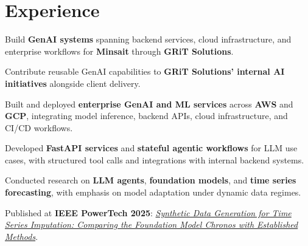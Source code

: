 \documentclass{seb-cv}
\begin{document}
\begin{minipage}[t]{0.64\textwidth}

\section{Experience}

\begin{tightemize}
  \item Build \textbf{GenAI systems} spanning backend services, cloud infrastructure, and enterprise workflows for \textbf{Minsait} through \textbf{GRiT Solutions}.
  \item Contribute reusable GenAI capabilities to \textbf{GRiT Solutions' internal AI initiatives} alongside client delivery.
\end{tightemize}

\entrysep

\begin{tightemize}
  \item Built and deployed \textbf{enterprise GenAI and ML services} across \textbf{AWS} and \textbf{GCP}, integrating model inference, backend APIs, cloud infrastructure, and CI/CD workflows.
  \item Developed \textbf{FastAPI services} and \textbf{stateful agentic workflows} for LLM use cases, with structured tool calls and integrations with internal backend systems.
\end{tightemize}

\entrysep

\begin{tightemize}
  \item Conducted research on \textbf{LLM agents}, \textbf{foundation models}, and \textbf{time series forecasting}, with emphasis on model adaptation under dynamic data regimes.
  \item Published at \textbf{IEEE PowerTech 2025}: {\emph{\href{https://ieeexplore.ieee.org/document/11180285}{Synthetic Data Generation for Time Series Imputation: Comparing the Foundation Model Chronos with Established Methods}}}.
\end{tightemize}


\end{minipage}
\end{document}
